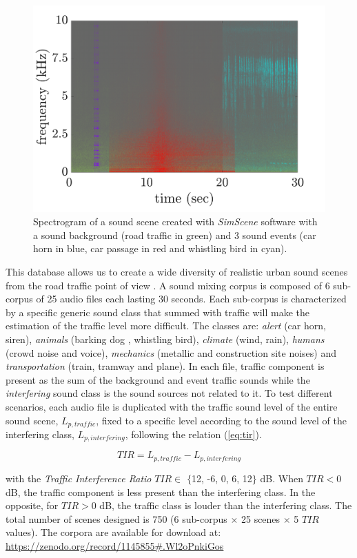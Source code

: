 \documentclass[twocolumn,a4paper,10pt]{article}
\begin{document}
\begin{figure}[t]
    \centering
       \includegraphics[width=.8\linewidth]{./figures/exampleSimScene}
    \caption{Spectrogram of a sound scene created with \textit{SimScene} software with a sound background (road traffic in green) and 3 sound events (car horn in blue, car passage in red and whistling bird in cyan).}
    \label{fig:example_simScene}
\end{figure}

This database allows us to create a wide diversity of realistic urban sound scenes from the road traffic point of view \cite{gloaguen_creation_2017}. A sound mixing corpus is composed of 6 sub-corpus of 25 audio files each lasting 30 seconds. Each sub-corpus is characterized by a specific generic sound class that summed with traffic will make the estimation of the traffic level more difficult. The classes are: \textit{alert} (car horn, siren), \textit{animals} (barking dog , whistling bird), \textit{climate} (wind, rain), \textit{humans} (crowd noise and voice), \textit{mechanics} (metallic and construction site noises) and \textit{transportation} (train, tramway and plane). In each file, traffic component is present as the sum of the background and event traffic sounds while the \textit{interfering} sound class is the sound sources not related to it. To test different scenarios, each audio file is duplicated with the traffic sound level of the entire sound scene, $L_{p,traffic}$, fixed to a specific level according to the sound level of the interfering class, $L_{p,interfering}$,  following the relation (\ref{eq:tir}).

\begin{equation}\label{eq:tir}
TIR = L_{p,traffic}-L_{p,interfering}
\end{equation}

with the \textit{Traffic Interference Ratio} $TIR \in$ $\lbrace$12, -6, 0, 6, 12$\rbrace$ dB. When $TIR < 0$ dB, the traffic component is less present than the interfering class. In the opposite, for $TIR > 0$ dB, the traffic class is louder than the interfering class. The total number of scenes designed is 750 (6 sub-corpus $\times$ 25 scenes $\times$  5 $TIR$ values). The corpora are available for download at: \url{https://zenodo.org/record/1145855#.Wl2oPnkiGos}
\end{document}
